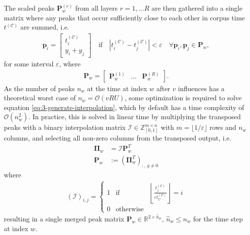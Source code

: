 The scaled peaks $\bm P^{(r)}_w$ from all layers $r=1,\dots R$ are then gathered into a single matrix where any peaks that occur sufficiently close to each other in corpus time $t^{(\mathcal C)}$ are summed, i.e.
\begin{align}\label{eq:3-generate-interpolation}
	\bm p_i = \begin{bmatrix} t^{(\mathcal C)}_i \\ y_i + y_j \end{bmatrix} \quad \text{if} \quad \left\lvert t_i^{(\mathcal C)} - t_j^{(\mathcal C)} \right\rvert < \varepsilon \quad \forall \bm p_i, \bm p_j \in \bm P_w,
\end{align}
for some interval $\varepsilon$, where 
\begin{align}
	\bm P_w = \begin{bmatrix} \bm P^{(1)}_w & \dots & \bm P^{(R)}_w \end{bmatrix}.
\end{align}
As the number of peaks $n_w$ at the time at index $w$ after $v$ influences has a theoretical worst case of $n_w = \mathcal{O}\left(vRU\right)$, some optimization is required to solve equation \ref{eq:3-generate-interpolation}, which by default has a time complexity of $\mathcal O \left(n^2_w\right)$. In practice, this is solved in linear time by multiplying the transposed peaks with a binary interpolation matrix $\mathcal I \in \mathbb Z_{[0,1]}^{m\times n}$ with $m = \lfloor 1/\varepsilon \rfloor$ rows and $n_w$ columns, and selecting all non-zero columns from the transposed output, i.e.
\begin{align}
	\bm\Pi_w &= \mathcal{I} \bm P_w^T \\
	\bm{P}_w &:= \left(\bm \Pi_w^T\right)_{\colon, \, y\ne 0}
\end{align}
where
\begin{align}
	\left(\mathcal I\right)_{i, j} = \left\lbrace\begin{array}{lcl}
		1 & \text{if} & \left\lfloor \frac{t_j^{(\mathcal C)}}{\varepsilon t_U^{(\mathcal C)}}\right\rfloor = i\\
		0 & \text{otherwise} &
	\end{array}\right.
\end{align}
resulting in a single merged peak matrix $\bm{P}_w \in \mathbb R^{2\times \hat n_w}$, $\hat n_w \le n_w$ for the time step at index $w$.


